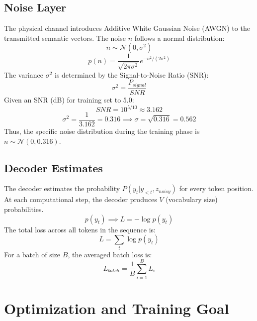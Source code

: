 \documentclass[twocolumn]{article}
\begin{document}
\subsection{\textbf{Noise Layer}}
The physical channel introduces Additive White Gaussian Noise (AWGN) to the transmitted semantic vectors. The noise $n$ follows a normal distribution:
\begin{equation}
    n \sim \mathcal{N}(0, \sigma^2)
\end{equation}
\begin{equation}
    p(n) = \frac{1}{\sqrt{2\pi\sigma^2}} e^{-n^2/(2\sigma^2)}
\end{equation}
The variance $\sigma^2$ is determined by the Signal-to-Noise Ratio (SNR):
\begin{equation}
    \sigma^2 = \frac{P_{signal}}{SNR}
\end{equation}
Given an SNR (dB) for training set to $5.0$:
\begin{equation}
    SNR = 10^{5/10} \approx 3.162
\end{equation}
\begin{equation}
    \sigma^2 = \frac{1}{3.162} = 0.316 \implies \sigma = \sqrt{0.316} = 0.562
\end{equation}
Thus, the specific noise distribution during the training phase is $n \sim \mathcal{N}(0, 0.316)$.

\subsection{\textbf{Decoder Estimates}}
The decoder estimates the probability $P(y_t | y_{<t}, z_{noisy})$ for every token position. At each computational step, the decoder produces $V$ (vocabulary size) probabilities. 
\begin{equation}
    p(y_t) \implies L = -\log p(y_t)
\end{equation}
The total loss across all tokens in the sequence is:
\begin{equation}
    L = \sum_t \log p(y_t)
\end{equation}
For a batch of size $B$, the averaged batch loss is:
\begin{equation}
    L_{batch} = \frac{1}{B} \sum_{i=1}^B L_i
\end{equation}

\section{\large \textbf{Optimization and Training Goal}}
\end{document}
